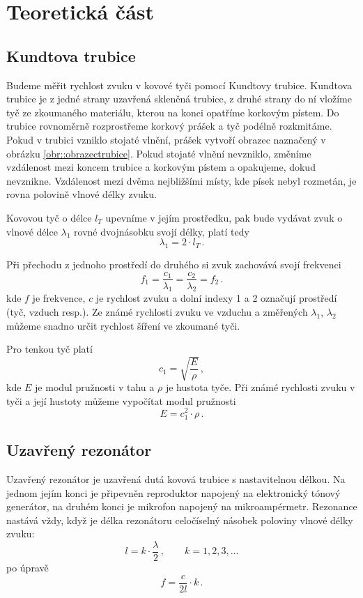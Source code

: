 \section*{Teoretická část}
\subsection*{Kundtova trubice}
Budeme měřit rychlost zvuku v kovové tyči pomocí Kundtovy trubice.
Kundtova trubice je z jedné strany uzavřená skleněná trubice, z druhé strany do ní vložíme tyč ze zkoumaného materiálu, kterou na konci opatříme korkovým pístem.
Do trubice rovnoměrně rozprostřeme korkový prášek a tyč podélně rozkmitáme.
Pokud v trubici vzniklo stojaté vlnění, prášek vytvoří obrazec naznačený v obrázku \ref{obr::obrazectrubice}.
Pokud stojaté vlnění nevzniklo, změníme vzdálenost mezi koncem trubice a korkovým pístem a opakujeme, dokud nevznikne.
Vzdálenost mezi dvěma nejbližšími místy, kde písek nebyl rozmetán, je rovna polovině vlnové délky zvuku.


Kovovou tyč o délce $l_T$ upevníme v jejím prostředku, pak bude vydávat zvuk o vlnové délce $\lambda_1$ rovné dvojnásobku svojí délky, platí tedy
\begin{equation}
\lambda_1=2 \cdot l_T  \,.
\end{equation}

Při přechodu z jednoho prostředí do druhého si zvuk zachovává svojí frekvenci
\begin{equation}
f_1= \frac{c_1}{\lambda_1}=\frac{c_2}{\lambda_2}=f_2 \,.
\end{equation}
kde $f$ je frekvence, $c$ je rychlost zvuku a dolní indexy 1 a 2 označují prostředí (tyč, vzduch resp.).
Ze známé rychlosti zvuku ve vzduchu a změřených $\lambda_1$, $\lambda_2$ můžeme snadno určit rychlost šíření ve zkoumané tyči.

Pro tenkou tyč platí \cite{ZFP}
\begin{equation}
c_1 = \sqrt{ \frac{E}{\rho}  } \,,
\end{equation}
kde $E$ je modul pružnosti v tahu a $\rho$ je hustota tyče.
Při známé rychlosti zvuku v tyči a její hustoty můžeme vypočítat modul pružnosti 
\begin{equation}
E=c_1^2 \cdot \rho \,.
\end{equation}


\subsection*{Uzavřený rezonátor}
Uzavřený rezonátor je uzavřená dutá kovová trubice s nastavitelnou délkou.
Na jednom jejím konci je připevněn reproduktor napojený na elektronický tónový generátor, na druhém konci je mikrofon napojený na mikroampérmetr.
Rezonance nastává vždy, když je délka rezonátoru celočíselný násobek poloviny vlnové délky zvuku:
\begin{equation} \label{eq::l_na_k}
l=k \cdot \frac{\lambda}{2} \,,  \qquad  k=1, 2, 3, \ldots
\end{equation}
po úpravě
\begin{equation} \label{eq::f_na_k}
f=\frac{c}{2l} \cdot k \,.
\end{equation}

